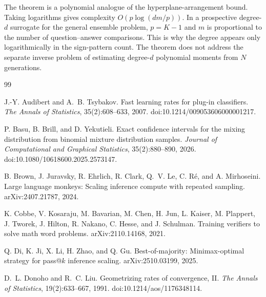 \documentclass[11pt]{article}
\begin{document}
The theorem is a polynomial analogue of the hyperplane-arrangement bound.  Taking logarithms gives complexity $O(p\log(dm/p))$.  In a prospective degree-$d$ surrogate for the general ensemble problem, $p=K-1$ and $m$ is proportional to the number of question--answer comparisons.  This is why the degree appears only logarithmically in the sign-pattern count.  The theorem does not address the separate inverse problem of estimating degree-$d$ polynomial moments from $N$ generations.

\begin{thebibliography}{99}

J.-Y. Audibert and A.~B. Tsybakov.
\newblock Fast learning rates for plug-in classifiers.
\newblock \emph{The Annals of Statistics}, 35(2):608--633, 2007.
\newblock doi:10.1214/009053606000001217.

P. Basu, B. Brill, and D. Yekutieli.
\newblock Exact confidence intervals for the mixing distribution from binomial mixture distribution samples.
\newblock \emph{Journal of Computational and Graphical Statistics}, 35(2):880--890, 2026.
\newblock doi:10.1080/10618600.2025.2573147.

B. Brown, J. Juravsky, R. Ehrlich, R. Clark, Q.~V. Le, C. R\'e, and A. Mirhoseini.
\newblock Large language monkeys: Scaling inference compute with repeated sampling.
\newblock arXiv:2407.21787, 2024.

K. Cobbe, V. Kosaraju, M. Bavarian, M. Chen, H. Jun, L. Kaiser, M. Plappert, J. Tworek, J. Hilton, R. Nakano, C. Hesse, and J. Schulman.
\newblock Training verifiers to solve math word problems.
\newblock arXiv:2110.14168, 2021.

Q. Di, K. Ji, X. Li, H. Zhao, and Q. Gu.
\newblock Best-of-majority: Minimax-optimal strategy for pass@$k$ inference scaling.
\newblock arXiv:2510.03199, 2025.

D.~L. Donoho and R.~C. Liu.
\newblock Geometrizing rates of convergence, II.
\newblock \emph{The Annals of Statistics}, 19(2):633--667, 1991.
\newblock doi:10.1214/aos/1176348114.


\end{thebibliography}
\end{document}
